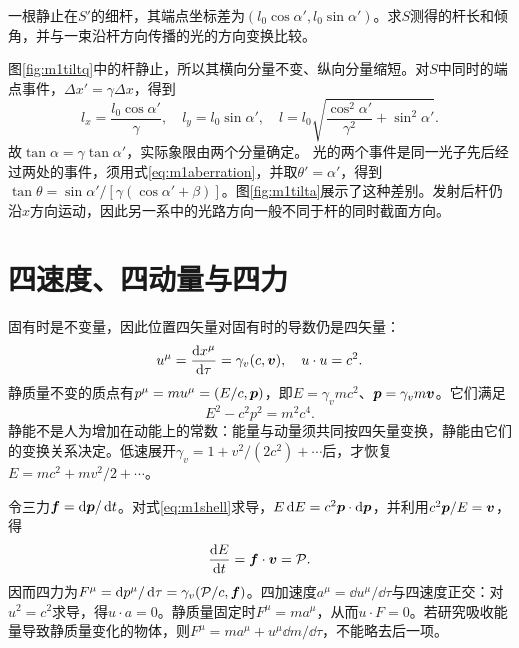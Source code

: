 \begin{example}\label{ex:m1tilt}
一根静止在$S'$的细杆，其端点坐标差为$(l_0\cos\alpha',l_0\sin\alpha')$。求$S$测得的杆长和倾角，并与一束沿杆方向传播的光的方向变换比较。
\end{example}
\begin{solution}
图\ref{fig:m1tiltq}中的杆静止，所以其横向分量不变、纵向分量缩短。对$S$中同时的端点事件，$\Delta x'=\gamma\Delta x$，得到
\[
 l_x=\frac{l_0\cos\alpha'}\gamma,\quad l_y=l_0\sin\alpha',\quad
 l=l_0\sqrt{\frac{\cos^2\alpha'}{\gamma^2}+\sin^2\alpha'}.
\]
故$\tan\alpha=\gamma\tan\alpha'$，实际象限由两个分量确定。
光的两个事件是同一光子先后经过两处的事件，须用式\eqref{eq:m1aberration}，并取$\theta'=\alpha'$，得到$\tan\theta=\sin\alpha'/[\gamma(\cos\alpha'+\beta)]$。图\ref{fig:m1tilta}展示了这种差别。发射后杆仍沿$x$方向运动，因此另一系中的光路方向一般不同于杆的同时截面方向。
\end{solution}

\section{四速度、四动量与四力}\label{th:m1dynamics}
固有时是不变量，因此位置四矢量对固有时的导数仍是四矢量：
\[
 u^\mu=\frac{\mathop{}\!\mathrm d x^\mu}{\mathop{}\!\mathrm d\tau}=\gamma_v(c,\bm{v}),
 \quad u\cdot u=c^2.
\]
静质量不变的质点有$p^\mu=mu^\mu=(E/c,\bm{p})$，即$E=\gamma_vmc^2$、$\bm{p}=\gamma_vm\bm{v}$。它们满足
\begin{equation}\label{eq:m1shell}
 E^2-c^2p^2=m^2c^4.
\end{equation}
静能不是人为增加在动能上的常数：能量与动量须共同按四矢量变换，静能由它们的变换关系决定。低速展开$\gamma_v=1+v^2/(2c^2)+\cdots$后，才恢复$E=mc^2+mv^2/2+\cdots$。

令三力$\bm{f}=\mathop{}\!\mathrm d\bm{p}/\mathop{}\!\mathrm d t$。对式\eqref{eq:m1shell}求导，$E\mathop{}\!\mathrm d E=c^2\bm{p}\cdot\mathop{}\!\mathrm d\bm{p}$，并利用$c^2\bm{p}/E=\bm{v}$，得
\[
 \frac{\mathop{}\!\mathrm d E}{\mathop{}\!\mathrm d t}=\bm{f}\cdot\bm{v}=\mathcal P.
\]
因而四力为$F^\mu=\mathop{}\!\mathrm d p^\mu/\mathop{}\!\mathrm d\tau=\gamma_v(\mathcal P/c,\bm{f})$。四加速度$a^\mu=\dd u^\mu/\dd\tau$与四速度正交：对$u^2=c^2$求导，得$u\cdot a=0$。静质量固定时$F^\mu=ma^\mu$，从而$u\cdot F=0$。若研究吸收能量导致静质量变化的物体，则$F^\mu=m a^\mu+u^\mu\dd m/\dd\tau$，不能略去后一项。

